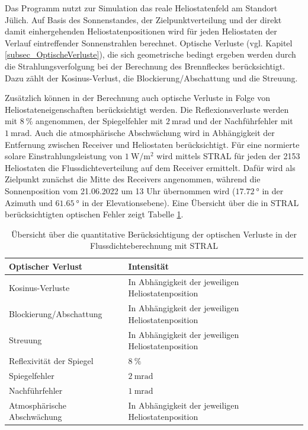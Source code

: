 Das Programm nutzt zur Simulation das reale Heliostatenfeld am Standort Jülich.
Auf Basis des Sonnenstandes, der Zielpunktverteilung und der direkt damit einhergehenden Heliostatenpositionen wird für jeden Heliostaten der Verlauf eintreffender Sonnenstrahlen berechnet.
Optische Verluste (vgl. Kapitel \ref{subsec_OptischeVerluste}), die sich geometrische bedingt ergeben werden durch die Strahlungsverfolgung bei der Berechnung des Brennfleckes berücksichtigt.
Dazu zählt der Kosinus-Verlust, die Blockierung/Abschattung und die Streuung.

Zusätzlich können in der Berechnung auch optische Verluste in Folge von Heliostateneigenschaften berücksichtigt werden.
Die Reflexionsverluste werden mit $\SI{8}{\percent}$ angenommen, der Spiegelfehler mit $\SI{2}{\milli\radian}$ und der Nachführfehler mit $\SI{1}{\milli\radian}$.
Auch die atmosphärische Abschwächung wird in Abhängigkeit der Entfernung zwischen Receiver und Heliostaten berücksichtigt.
Für eine normierte solare Einstrahlungsleistung von $\SI{1}{\watt\per\metre\squared}$ wird mittels STRAL für jeden der 2153 Heliostaten die Flussdichteverteilung auf dem Receiver ermittelt.
Dafür wird als Zielpunkt zunächst die Mitte des Receivers angenommen, während die Sonnenposition vom 21.06.2022 um 13 Uhr übernommen wird ($\SI{17.72}{\degree}$ in der Azimuth und $\SI{61.65}{\degree}$ in der Elevationsebene).
Eine Übersicht über die in STRAL berücksichtigten optischen Fehler zeigt Tabelle \ref{tab_optischeVerlustequantität}.

\begingroup
\renewcommand{\arraystretch}{1.2}
\begin{table}[ht!]
    \caption[Übersicht über die quantitative Berücksichtigung der optischen Verluste in der Flussdichteberechnung mit STRAL]{Übersicht über die quantitative Berücksichtigung der optischen Verluste in der Flussdichteberechnung mit STRAL}
    \centering
    \begin{tabular}{m{}m{}}
        \rowcolor{white}
        \toprule
        Optischer Verlust           & Intensität                                         \\
        \midrule
        Kosinus-Verluste            & In Abhängigkeit der jeweiligen Heliostatenposition \\
        Blockierung/Abschattung     & In Abhängigkeit der jeweiligen Heliostatenposition \\
        Streuung                    & In Abhängigkeit der jeweiligen Heliostatenposition \\
        Reflexivität der Spiegel    & $\SI{8}{\percent}$                                 \\
        Spiegelfehler               & $\SI{2}{\milli\radian}$                            \\
        Nachführfehler              & $\SI{1}{\milli\radian}$                            \\
        Atmosphärische Abschwächung & In Abhängigkeit der jeweiligen Heliostatenposition \\
        \toprule
    \end{tabular}
    \label{tab_optischeVerlustequantität}
\end{table}
\endgroup

